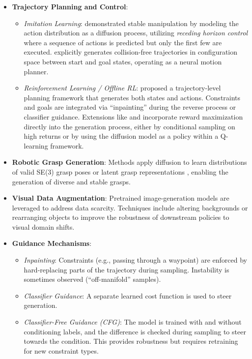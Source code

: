   \begin{itemize}
  \item
    \textbf{Trajectory Planning and Control}:

    \begin{itemize}
    \tightlist
    \item
      \emph{Imitation Learning}: \cite{chi2023diffusion} demonstrated stable manipulation by modeling the action
      distribution as a diffusion process, utilizing \emph{receding
      horizon control} where a sequence of actions is predicted but only
      the first few are executed. \cite{carvalho2023motion} explicitly generates collision-free
      trajectories in configuration space between start and goal states,
      operating as a neural motion planner.
    \item
      \emph{Reinforcement Learning / Offline RL}: \cite{janner2022diffuser} proposed a trajectory-level planning framework that
      generates both states and actions. Constraints and goals are
      integrated via ``inpainting'' during the reverse process or
      classifier guidance. Extensions like
      \cite{ajay2023decision} and \cite{wang2023diffusionql}
      incorporate reward maximization directly into the generation
      process, either by conditional sampling on high returns or by using the diffusion model as a policy within a
      Q-learning framework.
    \end{itemize}

  \item
    \textbf{Robotic Grasp Generation}: Methods apply diffusion to learn distributions of valid SE(3) grasp poses \cite{urain2023se3diff} or latent grasp representations \cite{barad2024graspldm}, enabling the generation of diverse and stable grasps.

  \item
    \textbf{Visual Data Augmentation}: Pretrained image-generation models are leveraged to address data scarcity. Techniques include altering backgrounds or rearranging objects to improve the robustness of downstream policies to visual domain shifts.

  \item
    \textbf{Guidance Mechanisms}:
    \begin{itemize}
    \tightlist
    \item
      \emph{Inpainting}: Constraints (e.g., passing through a waypoint)
      are enforced by hard-replacing parts of the trajectory during
      sampling. Instability is sometimes observed (``off-manifold''
      samples).
    \item
      \emph{Classifier Guidance}: A separate learned cost function is
      used to steer generation.
    \item
      \emph{Classifier-Free Guidance (CFG)}: The model is trained with
      and without conditioning labels, and the difference is checked
      during sampling to steer towards the condition. This provides
      robustness but requires retraining for new constraint types.
    \end{itemize}
  \end{itemize}
